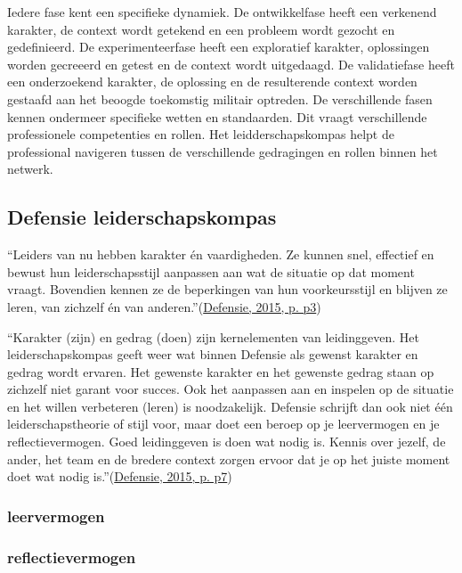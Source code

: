 \documentclass[
]{book}
\begin{document}
Iedere fase kent een specifieke dynamiek. De ontwikkelfase heeft een verkenend karakter, de context wordt getekend en een probleem wordt gezocht en gedefinieerd. De experimenteerfase heeft een exploratief karakter, oplossingen worden gecreeerd en getest en de context wordt uitgedaagd. De validatiefase heeft een onderzoekend karakter, de oplossing en de resulterende context worden gestaafd aan het beoogde toekomstig militair optreden. De verschillende fasen kennen ondermeer specifieke wetten en standaarden. Dit vraagt verschillende professionele competenties en rollen. Het leidderschapskompas helpt de professional navigeren tussen de verschillende gedragingen en rollen binnen het netwerk.

\hypertarget{defensie-leiderschapskompas}{%
\subsection{Defensie leiderschapskompas}\label{defensie-leiderschapskompas}}

``Leiders van nu hebben karakter én vaardigheden. Ze kunnen snel, effectief en bewust hun leiderschapsstijl aanpassen aan wat de situatie op dat moment vraagt. Bovendien kennen ze de beperkingen van hun voorkeursstijl en blijven ze leren, van zichzelf én van anderen.''(\protect\hyperlink{ref-ministerie_van_defensie_visie_2015}{Defensie, 2015, p. p3})

``Karakter (zijn) en gedrag (doen) zijn kernelementen van leidinggeven. Het leiderschapskompas geeft weer wat binnen Defensie als gewenst karakter en gedrag wordt ervaren. Het gewenste karakter en het gewenste gedrag staan op zichzelf niet garant voor succes. Ook het aanpassen aan en inspelen op de situatie en het willen verbeteren (leren) is noodzakelijk. Defensie schrijft dan ook niet één leiderschapstheorie of stijl voor, maar doet een beroep op je leervermogen en je reflectievermogen. Goed leidinggeven is doen wat nodig is. Kennis over jezelf, de ander, het team en de bredere context zorgen ervoor dat je op het juiste moment doet wat nodig is.''(\protect\hyperlink{ref-ministerie_van_defensie_visie_2015}{Defensie, 2015, p. p7})

\hypertarget{leervermogen}{%
\subsubsection{leervermogen}\label{leervermogen}}

\hypertarget{reflectievermogen}{%
\subsubsection{reflectievermogen}\label{reflectievermogen}}
\end{document}
